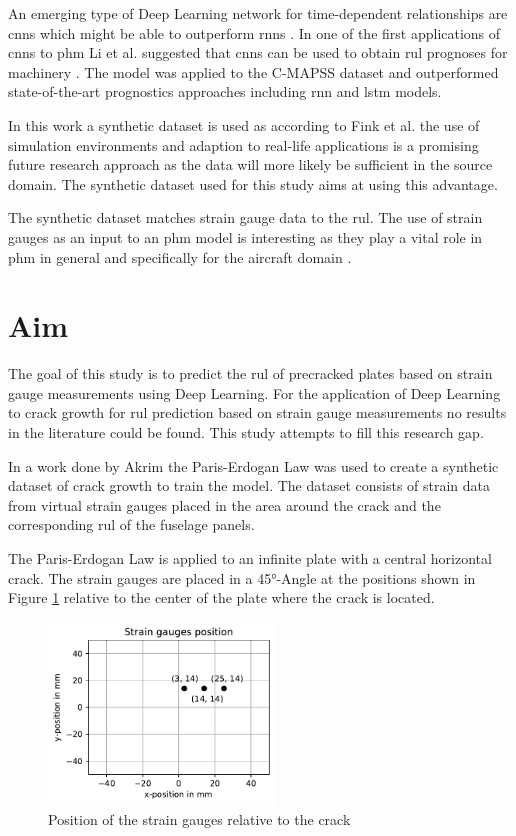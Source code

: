 \documentclass[conference]{IEEEtran}
\begin{document}
An emerging type of Deep Learning network for time-dependent relationships are \glspl{cnn} which might be able to outperform \glspl{rnn} \cite{Bai2018}. In one of the first applications of \glspl{cnn} to \gls{phm} Li et al. suggested that \glspl{cnn} can be used to obtain \gls{rul} prognoses for machinery \cite{Li2018}. The model was applied to the C-MAPSS dataset \cite{Saxena2008} and outperformed state-of-the-art prognostics approaches including \gls{rnn} and \gls{lstm} models.

In this work a synthetic dataset is used as according to Fink et al. \cite{Fink2020} the use of simulation environments and adaption to real-life applications is a promising future research approach as the data will more likely be sufficient in the source domain. The synthetic dataset used for this study aims at using this advantage.

The synthetic dataset matches strain gauge data to the \gls{rul}. The use of strain gauges as an input to an \gls{phm} model is interesting as they play a vital role in \gls{phm} in general \cite{Tinga2019} and specifically for the aircraft domain \cite{Timothy2009}.

\section{Aim}
\label{sec:aim}

The goal of this study is to predict the \gls{rul} of precracked plates based on strain gauge measurements using Deep Learning. 
For the application of Deep Learning to crack growth for \gls{rul} prediction based on strain gauge measurements no results in the literature could be found. This study attempts to fill this research gap.

In a work done by Akrim \cite{Akrim} the Paris-Erdogan Law \cite{Paris1963} was used to create a synthetic dataset of crack growth to train the model. The dataset consists of strain data from virtual strain gauges placed in the area around the crack and the corresponding \gls{rul} of the fuselage panels.

The Paris-Erdogan Law is applied to an infinite plate with a central horizontal crack. The strain gauges are placed in a 45°-Angle at the positions shown in Figure \ref{fig:strain_gauge_positions} relative to the center of the plate where the crack is located.

\begin{figure}[htp]
	\centering
	\includegraphics[width=6cm]{python/strain_gauges_position.pdf}
	\caption{Position of the strain gauges relative to the crack}
	\label{fig:strain_gauge_positions}
\end{figure}
\end{document}

